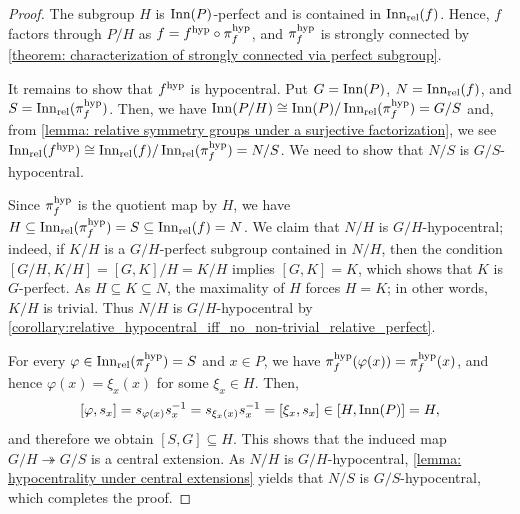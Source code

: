 \begin{proof}
The subgroup $H$ is $\operatorname{Inn}(P)$-perfect and is contained in $\operatorname{Inn_{rel}}(f)$. Hence, $f$ factors through $P/H$ as $f=f^{\mathrm{hyp}}\circ\pi_{f}^{\mathrm{hyp}}$, and $\pi_{f}^{\mathrm{hyp}}$ is strongly connected by \cref{theorem: characterization of strongly connected via perfect subgroup}.

It remains to show that $f^{\mathrm{hyp}}$ is hypocentral. Put $G=\operatorname{Inn}(P)$, $N=\operatorname{Inn_{rel}}(f)$, and $S=\operatorname{Inn_{rel}}(\pi_{f}^{\mathrm{hyp}})$. Then, we have $\operatorname{Inn}(P/H) \cong \operatorname{Inn}(P)/\operatorname{Inn_{rel}}(\pi_{f}^{\mathrm{hyp}}) = G/S$ and, from \cref{lemma: relative symmetry groups under a surjective factorization}, we see $\operatorname{Inn_{rel}}(f^{\mathrm{hyp}}) \cong \operatorname{Inn_{rel}}(f)/\operatorname{Inn_{rel}}(\pi_{f}^{\mathrm{hyp}}) = N/S$. We need to show that $N/S$ is $G/S$-hypocentral.

Since $\pi_{f}^{\mathrm{hyp}}$ is the quotient map by $H$, we have $H \subseteq \operatorname{Inn_{rel}}(\pi_{f}^{\mathrm{hyp}})=S \subseteq \operatorname{Inn_{rel}}(f)=N$. We claim that $N/H$ is $G/H$-hypocentral; indeed, if $K/H$ is a $G/H$-perfect subgroup contained in $N/H$, then the condition $[G/H,K/H]=[G,K]/H=K/H$ implies $[G,K] = K$, which shows that $K$ is $G$-perfect. As $H \subseteq K \subseteq N$, the maximality of $H$ forces $H=K$; in other words, $K/H$ is trivial. Thus $N/H$ is $G/H$-hypocentral by \cref{corollary:relative_hypocentral_iff_no_non-trivial_relative_perfect}.

For every $\varphi\in \operatorname{Inn_{rel}}(\pi_{f}^{\mathrm{hyp}})=S$ and $x\in P$, we have $\pi_{f}^{\mathrm{hyp}}(\varphi(x))=\pi_{f}^{\mathrm{hyp}}(x)$, and hence $\varphi(x)=\xi_x(x)$ for some $\xi_x \in H$. Then,
\[ [\varphi,s_x]=s_{\varphi(x)}s_x^{-1} = s_{\xi_x(x)}s_x^{-1} = [\xi_x,s_x] \in [H,\operatorname{Inn}(P)]=H, \]
and therefore we obtain $[S,G] \subseteq H$. This shows that the induced map $G/H \twoheadrightarrow G/S$ is a central extension.
As $N/H$ is $G/H$-hypocentral, \cref{lemma: hypocentrality under central extensions} yields that $N/S$ is $G/S$-hypocentral, which completes the proof.
\end{proof}



